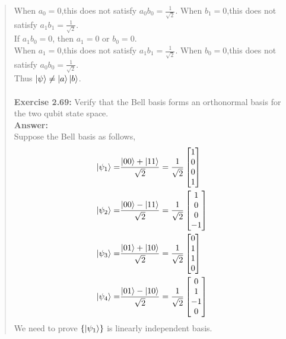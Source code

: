 \documentclass[UTF8]{ctexart}
\begin{document}
\begin{quote}
	When $a_{0}=0$,this does not satisfy $a_{0}b_{0}=\frac{1}{\sqrt{2}}$.
	When $b_{1}=0$,this does not satisfy $a_{1}b_{1}=\frac{1}{\sqrt{2}}$.\\
	If $a_{1}b_{0}=0$, then $a_{1}=0$ or $b_{0}=0$.\\
	When $a_{1}=0$,this does not satisfy $a_{1}b_{1}=\frac{1}{\sqrt{2}}$.
	When $b_{0}=0$,this does not satisfy $a_{0}b_{0}=\frac{1}{\sqrt{2}}$.\\
	Thus $\ket{\psi}\neq \ket{a}\ket{b}$. 
	\\
\\
\textbf{Exercise 2.69: } Verify that the Bell basis forms an orthonormal basis for the two qubit state space.
\\
\textbf{Answer:}\\
Suppose the Bell basis as follows, \\
\begin{equation}
	\begin{aligned}
		\ket{\psi_{1}}=&\frac{\ket{00}+\ket{11}}{\sqrt{2}}=\frac{1}{\sqrt{2}}
		\begin{bmatrix}
			1\\0\\0\\1
		\end{bmatrix}\\
		\ket{\psi_{2}}=&\frac{\ket{00}-\ket{11}}{\sqrt{2}}=\frac{1}{\sqrt{2}}\begin{bmatrix}
			1\\0\\0\\-1
		\end{bmatrix}\\
		\ket{\psi_{3}}=&\frac{\ket{01}+\ket{10}}{\sqrt{2}}=\frac{1}{\sqrt{2}}\begin{bmatrix}
			0\\1\\1\\0
		\end{bmatrix}\\
		\ket{\psi_{4}}=&\frac{\ket{01}-\ket{10}}{\sqrt{2}}=\frac{1}{\sqrt{2}}\begin{bmatrix}
			0\\1\\-1\\0
		\end{bmatrix}\\
	\end{aligned}
\end{equation} 
We need to prove $\{\ket{\psi_{1}}\}$ is linearly independent basis.

\end{quote}
\end{document}
